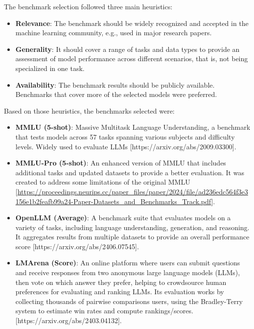         The benchmark selection followed three main heuristics:
        \begin{itemize}
            \item \textbf{Relevance}: The benchmark should be widely recognized and accepted in the machine learning community, e.g., used in major research papers.
            \item \textbf{Generality}: It should cover a range of tasks and data types to provide an assessment of model performance across different scenarios, that is, not being specialized in one task.
            \item \textbf{Availability}: The benchmark results should be publicly available. Benchmarks that cover more of the selected models were preferred.
        \end{itemize}

        Based on those heuristics, the benchmarks selected were:
        \begin{itemize}
            \item \textbf{MMLU (5-shot)}: Massive Multitask Language Understanding, a benchmark that tests models across 57 tasks spanning various subjects and difficulty levels. Widely used to evaluate LLMs [https://arxiv.org/abs/2009.03300].

            \item \textbf{MMLU-Pro (5-shot)}: An enhanced version of MMLU that includes additional tasks and updated datasets to provide a better evaluation. It was created to address some limitations of the original MMLU [\url{https://proceedings.neurips.cc/paper_files/paper/2024/file/ad236edc564f3e3156e1b2feafb99a24-Paper-Datasets_and_Benchmarks_Track.pdf}].
            
            \item \textbf{OpenLLM (Average)}: A benchmark suite that evaluates models on a variety of tasks, including language understanding, generation, and reasoning. It aggregates results from multiple datasets to provide an overall performance score [https://arxiv.org/abs/2406.07545].
            
            \item \textbf{LMArena (Score)}: An online platform where users can submit questions and receive responses from two anonymous large language models (LLMs), then vote on which answer they prefer, helping to crowdsource human preferences for evaluating and ranking LLMs. Its evaluation works by collecting thousands of pairwise comparisons users, using  the Bradley-Terry system to estimate win rates and compute rankings/scores. [https://arxiv.org/abs/2403.04132].
        \end{itemize}

